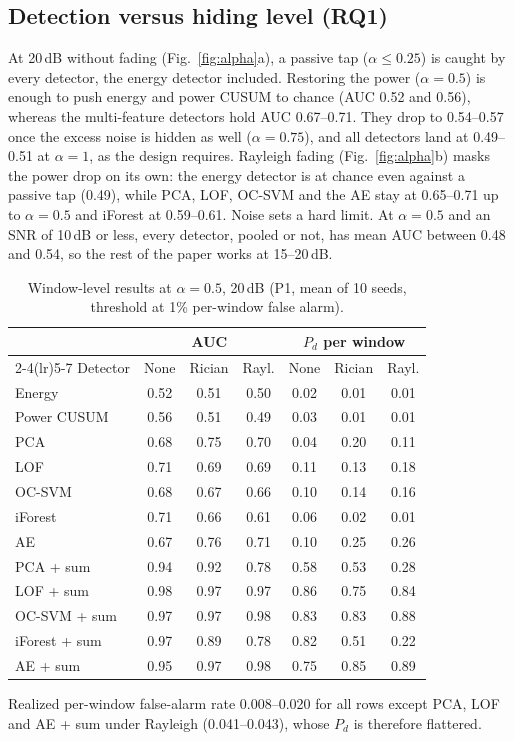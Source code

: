 \documentclass[conference]{IEEEtran}
\begin{document}
\subsection{Detection versus hiding level (RQ1)}
At 20\,dB without fading (Fig.~\ref{fig:alpha}a), a passive tap ($\alpha\le0.25$) is caught by every detector, the energy detector included. Restoring the power ($\alpha=0.5$) is enough to push energy and power CUSUM to chance (AUC 0.52 and 0.56), whereas the multi-feature detectors hold AUC 0.67--0.71. They drop to 0.54--0.57 once the excess noise is hidden as well ($\alpha=0.75$), and all detectors land at 0.49--0.51 at $\alpha=1$, as the design requires. Rayleigh fading (Fig.~\ref{fig:alpha}b) masks the power drop on its own: the energy detector is at chance even against a passive tap (0.49), while PCA, LOF, OC-SVM and the AE stay at 0.65--0.71 up to $\alpha=0.5$ and iForest at 0.59--0.61. Noise sets a hard limit. At $\alpha=0.5$ and an SNR of 10\,dB or less, every detector, pooled or not, has mean AUC between 0.48 and 0.54, so the rest of the paper works at 15--20\,dB.

\begin{table}[t]
\caption{Window-level results at $\alpha=0.5$, 20\,dB (P1, mean of 10 seeds, threshold at 1\% per-window false alarm).}
\label{tab:window}
\centering
\footnotesize
\setlength{\tabcolsep}{3.2pt}
\begin{tabular}{lcccccc}
\toprule
 & \multicolumn{3}{c}{AUC} & \multicolumn{3}{c}{$P_d$ per window} \\
\cmidrule(lr){2-4}\cmidrule(lr){5-7}
Detector & None & Rician & Rayl. & None & Rician & Rayl. \\
\midrule
Energy        & 0.52 & 0.51 & 0.50 & 0.02 & 0.01 & 0.01 \\
Power CUSUM   & 0.56 & 0.51 & 0.49 & 0.03 & 0.01 & 0.01 \\
\midrule
PCA           & 0.68 & 0.75 & 0.70 & 0.04 & 0.20 & 0.11 \\
LOF           & 0.71 & 0.69 & 0.69 & 0.11 & 0.13 & 0.18 \\
OC-SVM        & 0.68 & 0.67 & 0.66 & 0.10 & 0.14 & 0.16 \\
iForest       & 0.71 & 0.66 & 0.61 & 0.06 & 0.02 & 0.01 \\
AE            & 0.67 & 0.76 & 0.71 & 0.10 & 0.25 & 0.26 \\
\midrule
PCA + sum     & 0.94 & 0.92 & 0.78 & 0.58 & 0.53 & 0.28 \\
LOF + sum     & 0.98 & 0.97 & 0.97 & 0.86 & 0.75 & 0.84 \\
OC-SVM + sum  & 0.97 & 0.97 & 0.98 & 0.83 & 0.83 & 0.88 \\
iForest + sum & 0.97 & 0.89 & 0.78 & 0.82 & 0.51 & 0.22 \\
AE + sum      & 0.95 & 0.97 & 0.98 & 0.75 & 0.85 & 0.89 \\
\bottomrule
\end{tabular}

\smallskip
\parbox{\columnwidth}{\scriptsize Realized per-window false-alarm rate 0.008--0.020 for all rows except PCA, LOF and AE + sum under Rayleigh (0.041--0.043), whose $P_d$ is therefore flattered.}
\end{table}
\end{document}

